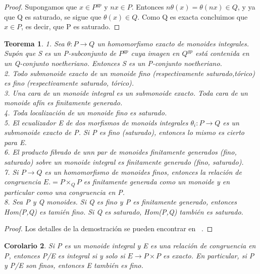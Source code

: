 \documentclass[12pt,spanish]{amsart}
\newtheorem{Theorem}{Teorema}[section]
\newtheorem{cor}[Theorem]{Corolario}
\theoremstyle{definition}
\theoremstyle{remark}
\begin{document}
\begin{proof}
Supongamos que $x\in P^{gp}$ y $nx\in P$. Entonces $n\theta(x)=\theta(nx)\in Q$, y ya que Q es saturado, se sigue que $\theta(x)\in Q$. Como Q es exacta concluimos que $x\in P$, es decir, que P es saturado.  
\end{proof}

\begin{Theorem}
1. Sea $\theta:P \to Q$ un homomorfismo exacto de monoides \textit{integral}es. Supón que S es un P-subconjunto de $P^{gp}$ cuya imagen en $Q^{gp}$ está contenida en un Q-conjunto noetheriano. Entonces S es un P-conjunto noetheriano. \\ 
2. Todo submonoide exacto de un monoide fino (respectivamente saturado,tórico) es fino (respectivamente saturado, tórico). \\ 
3. Una cara de un monoide \textit{integral} es un submonoide exacto. Toda cara de un monoide afín es finitamente generado. \\ 
4. Toda localización de un monoide fino es saturado. \\ 
5. El ecualizador E de dos morfismos de monoids \textit{integral}es $\theta_{i}:P \to Q$ es un submonoide exacto de P. Si P es fino (saturado), entonces lo mismo es cierto para E. \\ 
6. El producto fibrado de unn par de monoides finitamente generados (fino, saturado) sobre un monoide \textit{integral} es finitamente generado (fino, saturado). \\ 
7. Si $P \to Q$ es un homomorfismo de monoides finos, entonces la relación de congruencia $E.=P\times_{Q}P$ es finitamente generada como un monoide y en particular como una congruencia en P. \\ 
8. Sea P y Q monoides. Si Q es fino y P es finitamente generado, entonces Hom(P,Q) es tamién fino. Si Q es saturado, Hom(P,Q) también es saturado.  
\end{Theorem}

\begin{proof}
Los detalles de la demostración se pueden encontrar en ~\cite{Ogus:2018aa}. 
\end{proof}


\begin{cor}
Si P es un monoide \textit{integral} y E es una relación de congruencia en P, entonces P/E es \textit{integral} si y solo si $E \to P\times P$ es exacto. En particular, si P y P/E son finos, entonces E también es fino. 
\end{cor}
\end{document}
